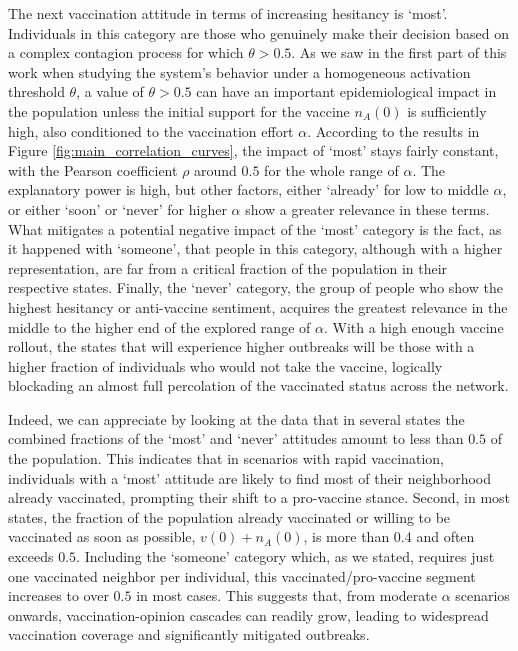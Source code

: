 \documentclass[
 reprint,
 amsmath,amssymb,
 aps,
]{revtex4-2}
\begin{document}
The next vaccination attitude in terms of increasing hesitancy is `most'. Individuals in this category are those who genuinely make their decision based on a complex contagion process for which $\theta>0.5$. As we saw in the first part of this work when studying the system's behavior under a homogeneous activation threshold $\theta$, a value of $\theta>0.5$ can have an important epidemiological impact in the population unless the initial support for the vaccine $n_A(0)$ is sufficiently high, also conditioned to the vaccination effort $\alpha$. According to the results in Figure \ref{fig:main_correlation_curves}, the impact of `most' stays fairly constant, with the Pearson coefficient $\rho$ around $0.5$ for the whole range of $\alpha$. The explanatory power is high, but other factors, either `already' for low to middle $\alpha$, or either `soon' or `never' for higher $\alpha$ show a greater relevance in these terms. What mitigates a potential negative impact of the `most' category is the fact, as it happened with `someone', that people in this category, although with a higher representation, are far from a critical fraction of the population in their respective states. Finally, the `never' category, the group of people who show the highest hesitancy or anti-vaccine sentiment, acquires the greatest relevance in the middle to the higher end of the explored range of $\alpha$. With a high enough vaccine rollout, the states that will experience higher outbreaks will be those with a higher fraction of individuals who would not take the vaccine, logically blockading an almost full percolation of the vaccinated status across the network.

Indeed, we can appreciate by looking at the data that in several states the combined fractions of the `most' and `never' attitudes amount to less than $0.5$ of the population. This indicates that in scenarios with rapid vaccination, individuals with a `most' attitude are likely to find most of their neighborhood already vaccinated, prompting their shift to a pro-vaccine stance. Second, in most states, the fraction of the population already vaccinated or willing to be vaccinated as soon as possible, $v(0)+n_A(0)$, is more than $0.4$ and often exceeds $0.5$. Including the `someone' category which, as we stated, requires just one vaccinated neighbor per individual, this vaccinated/pro-vaccine segment increases to over $0.5$ in most cases. This suggests that, from moderate $\alpha$ scenarios onwards, vaccination-opinion cascades can readily grow, leading to widespread vaccination coverage and significantly mitigated outbreaks.
\end{document}
